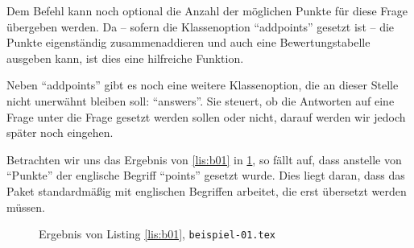 Dem   Befehl kann noch optional die Anzahl der möglichen Punkte für diese Frage übergeben werden. Da  -- sofern die Klassenoption \enquote{addpoints} gesetzt ist -- die Punkte eigenständig zusammenaddieren und auch eine Bewertungstabelle ausgeben kann, ist dies eine hilfreiche Funktion.

Neben \enquote{addpoints} gibt es noch eine weitere Klassenoption, die an dieser Stelle nicht unerwähnt bleiben soll: \enquote{answers}. Sie steuert, ob die Antworten auf eine Frage unter die Frage gesetzt werden sollen oder nicht, darauf werden wir jedoch später noch eingehen.

Betrachten wir uns das Ergebnis von \ref{lis:b01} in \cref{fig:b01}, so fällt auf, dass anstelle von \enquote{Punkte} der englische Begriff \enquote{points} gesetzt wurde. 
Dies liegt daran, dass das Paket standardmäßig mit englischen Begriffen arbeitet, die erst übersetzt werden müssen. 

\begin{figure}
\caption{Ergebnis von Listing \ref{lis:b01}, \texttt{beispiel-01.tex}}\label{fig:b01}
\end{figure}

